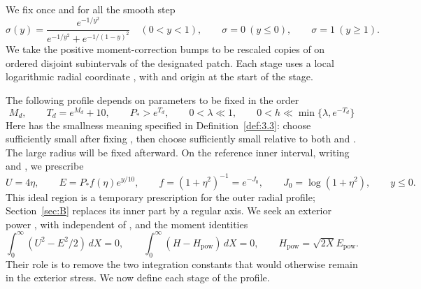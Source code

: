 We fix once and for all the smooth step
\begin{equation}
\sigma(y)=\frac{e^{-1/y^2}}{e^{-1/y^2}+e^{-1/(1-y)^2}}
\quad(0<y<1),
\qquad \sigma=0\ (y\le0),
\qquad \sigma=1\ (y\ge1).
\tag{A.5}\label{eq:A.5}
\end{equation}
We take the positive moment-correction bumps to be rescaled copies of
 on ordered disjoint subintervals of the designated patch. Each stage
uses a local logarithmic radial coordinate , with
 and origin at the start of the stage.

The following profile depends on parameters to be fixed in the order
\begin{equation}
M_d,
\qquad T_d=e^{M_d}+10,
\qquad P_*>e^{T_d},
\qquad 0<\lambda\ll1,
\qquad 0<h\ll\min\{\lambda,e^{-T_d}\}
\tag{A.6}\label{eq:A.6}
\end{equation}
Here  has the smallness meaning specified in Definition~\ref{def:3.3}:
choose  sufficiently small after fixing
, then choose  sufficiently small
relative to both  and . The large
radius  will be fixed afterward. On the reference inner interval,
writing  and , we prescribe
\begin{equation}
U=4\eta,
\qquad E=P_*f(\eta)e^{y/10},
\qquad f=(1+\eta^2)^{-1}=e^{-J_0},
\qquad J_0=\log(1+\eta^2),
\qquad y\le0.
\tag{A.7}\label{eq:A.7}
\end{equation}
This ideal region is a temporary prescription for the outer radial profile; Section~\ref{sec:B}
replaces its inner part by a regular axis. We seek an exterior power
, with
 independent of , and the moment
identities
\begin{equation}
\int_0^\infty(U^2-E^2/2)\,dX=0,
\qquad
\int_0^\infty(H-H_{\mathrm{pow}})\,dX=0,
\qquad
H_{\mathrm{pow}}=\sqrt{2X}E_{\mathrm{pow}}.
\tag{A.8}\label{eq:A.8}
\end{equation}
Their role is to remove the two integration constants that would otherwise remain in the exterior
stress. We now define each stage of the profile.


